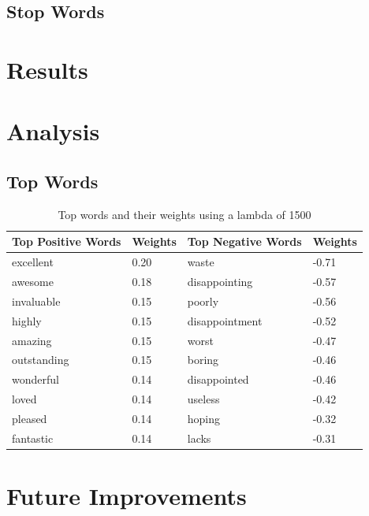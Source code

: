 \documentclass{article}
\begin{document}
\subsection{Stop Words}



\section{Results}

\section{Analysis}
\subsection{Top Words}

\begin{table}
    \begin{tabular}{|l|l|l|l|}
        \hline
        Top Positive Words & Weights & Top Negative Words & Weights \\ \hline
        excellent   & 0.20 & waste          & -0.71 \\ 
        awesome     & 0.18 & disappointing  & -0.57 \\ 
        invaluable  & 0.15 & poorly         & -0.56 \\ 
        highly      & 0.15 & disappointment & -0.52 \\ 
        amazing     & 0.15 & worst          & -0.47 \\ 
        outstanding & 0.15 & boring         & -0.46 \\ 
        wonderful   & 0.14 & disappointed   & -0.46 \\ 
        loved       & 0.14 & useless        & -0.42 \\ 
        pleased     & 0.14 & hoping         & -0.32 \\ 
        fantastic   & 0.14 & lacks          & -0.31 \\
        \hline
    \end{tabular}
    \caption{Top words and their weights using a lambda of 1500}
    \label{tab:words}
\end{table}


\section{Future Improvements}





\end{document}
